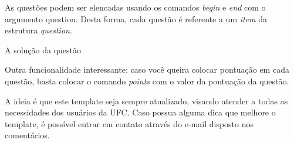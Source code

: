 \documentclass{ufcatemplates}
\begin{document}
    \makeheaderexercise

    \vspace{1cm}
    

    \question As questões podem ser elencadas usando os comandos \textit{begin} e \textit{end} com o argumento question. Desta forma, cada questão é referente a um \textit{item} da estrutura \textit{question}.

    \begin{sol}
      A solução da questão
      
    
    \end{sol}

    \question Outra funcionalidade interessante: caso você queira colocar pontuação em cada questão, basta colocar o comando \textit{points} com o valor da pontuação da questão. 
        
    \question A ideia é que este template seja sempre atualizado, visando atender a todas as necessidades dos usuários da UFC. Caso possua alguma dica que melhore o template, é possível entrar em contato através do e-mail disposto nos comentários.
\end{document}
